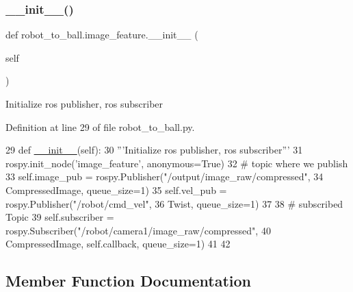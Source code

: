\subsubsection{\texorpdfstring{\+\_\+\+\_\+init\+\_\+\+\_\+()}{\_\_init\_\_()}}
{\footnotesize\ttfamily def robot\+\_\+to\+\_\+ball.\+image\+\_\+feature.\+\_\+\+\_\+init\+\_\+\+\_\+ (\begin{DoxyParamCaption}\item[{}]{self }\end{DoxyParamCaption})}

\begin{DoxyVerb}Initialize ros publisher, ros subscriber\end{DoxyVerb}
 

Definition at line 29 of file robot\+\_\+to\+\_\+ball.\+py.


\begin{DoxyCode}
29     \textcolor{keyword}{def }\hyperlink{classstate__machine_1_1Play_a5993a23d8be7f7b2647f71ede0334957}{\_\_init\_\_}(self):
30         \textcolor{stringliteral}{'''Initialize ros publisher, ros subscriber'''}
31         rospy.init\_node(\textcolor{stringliteral}{'image\_feature'}, anonymous=\textcolor{keyword}{True})
32      \textcolor{comment}{# topic where we publish}
33         self.image\_pub = rospy.Publisher(\textcolor{stringliteral}{"/output/image\_raw/compressed"},
34                                          CompressedImage, queue\_size=1)
35         self.vel\_pub = rospy.Publisher(\textcolor{stringliteral}{"/robot/cmd\_vel"},
36                                        Twist, queue\_size=1)
37 
38         \textcolor{comment}{# subscribed Topic}
39         self.subscriber = rospy.Subscriber(\textcolor{stringliteral}{"/robot/camera1/image\_raw/compressed"},
40                                            CompressedImage, self.callback,  queue\_size=1)
41 
42 
\end{DoxyCode}


\subsection{Member Function Documentation}
\mbox{\label{classrobot__to__ball_1_1image__feature_a1193dd210c472ae7ec719b513a41daaf}} 
